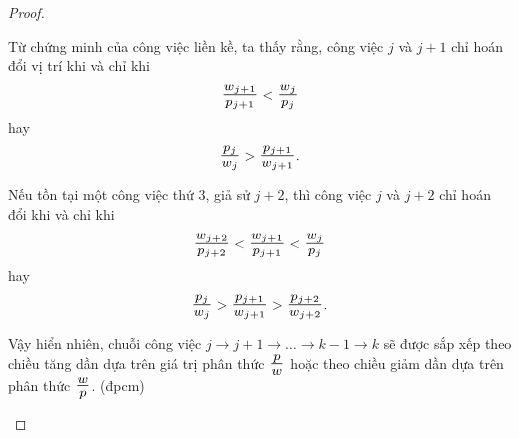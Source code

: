 \documentclass[12pt,a4paper]{report}
\begin{document}
\begin{proof}
\begin{itemize}
Từ chứng minh của công việc liền kề, ta thấy rằng, công việc $j$ và $j+1$ chỉ hoán đổi vị trí khi và chỉ khi $$\scalebox{1.3}{$\frac{w_{j+1}}{p_{j+1}}$} < \scalebox{1.3}{$\frac{w_j}{p_j}$}$$ hay $$\scalebox{1.3}{$\frac{p_j}{w_j}$} > \scalebox{1.3}{$\frac{p_{j+1}}{w_{j+1}}$}.$$

Nếu tồn tại một công việc thứ 3, giả sử $j+2$, thì công việc $j$ và $j+2$ chỉ hoán đổi khi và chỉ khi $$\scalebox{1.3}{$\frac{w_{j+2}}{p_{j+2}}$} < \scalebox{1.3}{$\frac{w_{j+1}}{p_{j+1}}$} < \scalebox{1.3}{$\frac{w_j}{p_j}$}$$ hay $$\scalebox{1.3}{$\frac{p_j}{w_j}$} > \scalebox{1.3}{$\frac{p_{j+1}}{w_{j+1}}$} > \scalebox{1.3}{$\frac{p_{j+2}}{w_{j+2}}$}.$$

Vậy hiển nhiên, chuỗi công việc $j \rightarrow j+1 \rightarrow \ldots \rightarrow k-1 \rightarrow k$ sẽ được sắp xếp theo chiều tăng dần dựa trên giá trị phân thức $\scalebox{1.3}{$\frac{p}{w}$}$ hoặc theo chiều giảm dần dựa trên phân thức $\scalebox{1.3}{$\frac{w}{p}$}$. (đpcm)

\end{itemize}



	
	
	


\end{proof}
\end{document}
